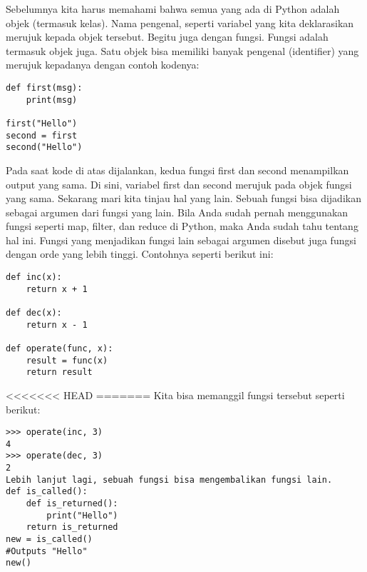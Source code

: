 \documentclass[12pt,a4paper]{article}
\begin{document}
Sebelumnya kita harus memahami bahwa semua yang ada di Python adalah objek (termasuk kelas). Nama pengenal, seperti variabel yang kita deklarasikan merujuk kepada objek tersebut. Begitu juga dengan fungsi. Fungsi adalah termasuk objek juga. Satu objek bisa memiliki banyak pengenal (identifier) yang merujuk kepadanya dengan contoh kodenya:

\begin{verbatim}
def first(msg):
    print(msg)

first("Hello")
second = first
second("Hello")
\end{verbatim}

Pada saat kode di atas dijalankan, kedua fungsi first dan second menampilkan output yang sama. Di sini, variabel first dan second merujuk pada objek fungsi yang sama.
Sekarang mari kita tinjau hal yang lain. Sebuah fungsi bisa dijadikan sebagai argumen dari fungsi yang lain.
Bila Anda sudah pernah menggunakan fungsi seperti map, filter, dan reduce di Python, maka Anda sudah tahu tentang hal ini.
Fungsi yang menjadikan fungsi lain sebagai argumen disebut juga fungsi dengan orde yang lebih tinggi. Contohnya seperti berikut ini:

\begin{verbatim}
def inc(x):
    return x + 1
    
def dec(x):
    return x - 1
    
def operate(func, x):
    result = func(x)
    return result
\end{verbatim}

<<<<<<< HEAD
=======
Kita bisa memanggil fungsi tersebut seperti berikut:

\begin{verbatim}
>>> operate(inc, 3)
4
>>> operate(dec, 3)
2
Lebih lanjut lagi, sebuah fungsi bisa mengembalikan fungsi lain.
def is_called():
    def is_returned():
        print("Hello")
    return is_returned
new = is_called()
#Outputs "Hello"
new()
\end{verbatim}
\end{document}
